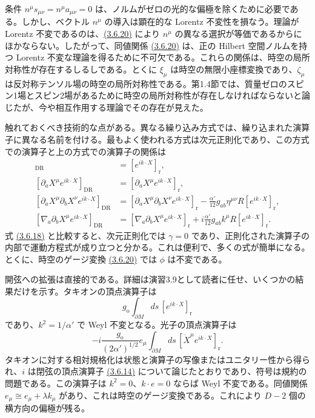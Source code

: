 条件 $n^\mu s_{\mu\nu}=n^\mu a_{\mu\nu}=0$ は、ノルムがゼロの光的な偏極を除くために必要である。しかし、ベクトル $n^\mu$ の導入は顕在的な Lorentz 不変性を損なう。理論が Lorentz 不変であるのは、\hyperref[eq:3.6.20a]{(3.6.20)} により $n^\mu$ の異なる選択が等価であるからにほかならない。したがって、同値関係 \hyperref[eq:3.6.20a]{(3.6.20)} は、正の Hilbert 空間ノルムを持つ Lorentz 不変な理論を得るために不可欠である。これらの関係は、時空の局所対称性が存在するしるしである。とくに $\xi_\mu$ は時空の無限小座標変換であり、$\zeta_\mu$ は反対称テンソル場の時空の局所対称性である。第1.4節では、質量ゼロのスピン1場とスピン2場があるために時空の局所対称性が存在しなければならないと論じたが、今や相互作用する理論でその存在が見えた。

触れておくべき技術的な点がある。異なる繰り込み方式では、繰り込まれた演算子に異なる名前を付ける。最もよく使われる方式は次元正則化であり、この方式での演算子と上の方式での演算子の関係は
\begin{align}
[e^{ik\cdot X}]_{\mathrm{DR}}
&=[e^{ik\cdot X}]_{\mathrm r},
\tag{3.6.24a}\label{eq:3.6.24a}\\
[\partial_aX^\mu e^{ik\cdot X}]_{\mathrm{DR}}
&=[\partial_aX^\mu e^{ik\cdot X}]_{\mathrm r},
\tag{3.6.24b}\label{eq:3.6.24b}\\
[\partial_aX^\mu\partial_bX^\nu e^{ik\cdot X}]_{\mathrm{DR}}
&=[\partial_aX^\mu\partial_bX^\nu e^{ik\cdot X}]_{\mathrm r}
-\frac{\alpha'}{12}g_{ab}\eta^{\mu\nu}R[e^{ik\cdot X}]_{\mathrm r},
\tag{3.6.24c}\label{eq:3.6.24c}\\
[\nabla_a\partial_bX^\mu e^{ik\cdot X}]_{\mathrm{DR}}
&=[\nabla_a\partial_bX^\mu e^{ik\cdot X}]_{\mathrm r}
+i\frac{\alpha'}{12}g_{ab}k^\mu R[e^{ik\cdot X}]_{\mathrm r}.
\tag{3.6.24d}\label{eq:3.6.24d}
\end{align}
式 \hyperref[eq:3.6.18]{(3.6.18)} と比較すると、次元正則化では $\gamma=0$ であり、正則化された演算子の内部で運動方程式が成り立つと分かる。これは便利で、多くの式が簡単になる。とくに、時空のゲージ変換 \hyperref[eq:3.6.20a]{(3.6.20)} では $\phi$ は不変である。


開弦への拡張は直接的である。詳細は演習3.9として読者に任せ、いくつかの結果だけを示す。タキオンの頂点演算子は
\begin{equation}
g_{\mathrm o}\int_{\partial M}ds\,[e^{ik\cdot X}]_{\mathrm r}
\tag{3.6.25}\label{eq:3.6.25}
\end{equation}
であり、$k^2=1/\alpha'$ で Weyl 不変となる。光子の頂点演算子は
\begin{equation}
-i\frac{g_{\mathrm o}}{(2\alpha')^{1/2}}e_\mu
\int_{\partial M}ds\,[\dot X^\mu e^{ik\cdot X}]_{\mathrm r}.
\tag{3.6.26}\label{eq:3.6.26}
\end{equation}
タキオンに対する相対規格化は状態と演算子の写像またはユニタリー性から得られ、$i$ は閉弦の頂点演算子 \hyperref[eq:3.6.14]{(3.6.14)} について論じたとおりであり、符号は規約の問題である。この演算子は $k^2=0$、$k\cdot e=0$ ならば Weyl 不変である。同値関係 $e_\mu\cong e_\mu+\lambda k_\mu$ があり、これは時空のゲージ変換である。これにより $D-2$ 個の横方向の偏極が残る。

